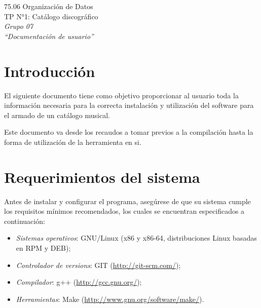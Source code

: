\documentclass{article}
\begin{document}
\begin{titlepage}
	\vspace*{\fill}
	\begin{center}
		\Large 75.06 Organización de Datos \\
		\Huge TP N°1: Catálogo discográfico \\
		\bigskip\huge\textit{Grupo 07} \\
		\bigskip\bigskip\bigskip\bigskip\bigskip\bigskip
		\bigskip\bigskip\bigskip\bigskip\bigskip\bigskip\bigskip
		\medskip\huge\textit{``Documentación de usuario''} \\
		\date{}
	\end{center}
	\vspace*{\fill}
\end{titlepage}
\newpage



\tableofcontents
\newpage




\section{Introducción}
	
	El siguiente documento tiene como objetivo proporcionar al usuario toda la información necesaria para la correcta instalación y utilización del software para el armado de un catálogo musical.
	\par
	Este documento va desde los recaudos a tomar previos a la compilación hasta la forma de utilización de la herramienta en si.
\bigskip




\section{Requerimientos del sistema}

	Antes de instalar y configurar el programa, asegúrese de que su sistema cumple los requisitos mínimos recomendados, los cuales se encuentran especificados a continuación:
	\medskip

\begin{itemize}
\itemsep=5pt \topsep=0pt \partopsep=0pt \parskip=0pt \parsep=0pt

	\item \textit{Sistemas operativos}: GNU/Linux (x86 y x86-64, distribuciones Linux basadas en RPM y DEB);

	\item \textit{Controlador de versions}: GIT (\url{http://git-scm.com/});

	\item \textit{Compilador}: g++ (\url{http://gcc.gnu.org/});

	\item \textit{Herramientas}: Make (\url{http://www.gnu.org/software/make/}).

\end{itemize}
\bigskip
\end{document}
